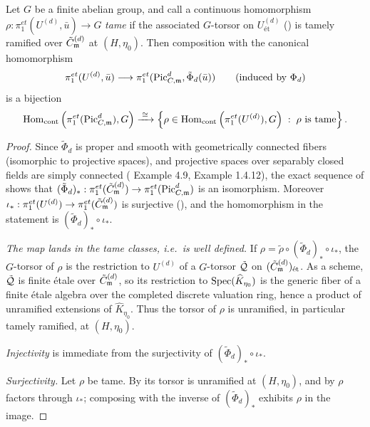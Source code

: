 \begin{cor}\label{cor:route_two_precise_r2}
    Let $G$ be a finite abelian group, and call a continuous homomorphism
    $\rho : \pi_1^{et}(U^{(d)}, \bar{u}) \to G$ \emph{tame} if the associated $G$-torsor on
    $U^{(d)}_{\text{\'et}}$ () is tamely
    ramified over $\Cmod{d}$ at $(H, \eta_0)$. Then composition with the canonical
    homomorphism
    \[ \pi_1^{et}(U^{(d)}, \bar{u}) \longrightarrow \pi_1^{et}(\PicCm[d], \tilde{\Phi}_d(\bar{u}))
       \qquad (\text{induced by } \Phi_d) \]
    is a bijection
    \[ \mathrm{Hom}_{\mathrm{cont}}\left( \pi_1^{et}(\PicCm[d]), G \right)
       \xrightarrow{\;\cong\;}
       \left\{ \rho \in \mathrm{Hom}_{\mathrm{cont}}\left( \pi_1^{et}(U^{(d)}), G \right)
       \; : \; \rho \text{ is tame} \right\}. \]
\end{cor}
\begin{proof}
    Since $\tilde{\Phi}_d$ is proper and smooth with geometrically connected fibers
    (isomorphic to projective spaces), and projective spaces over separably closed fields are
    simply connected (\cite{tendler2015geometricclassfieldtheory} Example 4.9, \cite{Toth2011}
    Example 1.4.12), the exact sequence of
     shows that
    $(\tilde{\Phi}_d)_* : \pi_1^{et}(\Cmod{d}) \to \pi_1^{et}(\PicCm[d])$ is an isomorphism.
    Moreover $\iota_* : \pi_1^{et}(U^{(d)}) \to \pi_1^{et}(\Cmod{d})$ is surjective
    (), and the homomorphism in the statement is
    $(\tilde{\Phi}_d)_* \circ \iota_*$.

    \emph{The map lands in the tame classes, i.e.\ is well defined.} If
    $\rho = \tilde{\rho} \circ (\tilde{\Phi}_d)_* \circ \iota_*$, the $G$-torsor of $\rho$ is
    the restriction to $U^{(d)}$ of a $G$-torsor $\tilde{\cQ}$ on $(\Cmod{d})_{\text{\'et}}$.
    As a scheme, $\tilde{\cQ}$ is finite \'etale over $\Cmod{d}$, so its restriction to
    $\Spec(\widehat{K}_{\eta_0})$ is the generic fiber of a finite \'etale algebra over the
    completed discrete valuation ring, hence a product of unramified extensions of
    $\widehat{K}_{\eta_0}$. Thus the torsor of $\rho$ is unramified, in particular tamely
    ramified, at $(H, \eta_0)$.

    \emph{Injectivity} is immediate from the surjectivity of
    $(\tilde{\Phi}_d)_* \circ \iota_*$.

    \emph{Surjectivity.} Let $\rho$ be tame. By
     its torsor is unramified at
    $(H, \eta_0)$, and by  $\rho$ factors through
    $\iota_*$; composing with the inverse of $(\tilde{\Phi}_d)_*$ exhibits $\rho$ in the
    image.
\end{proof}


